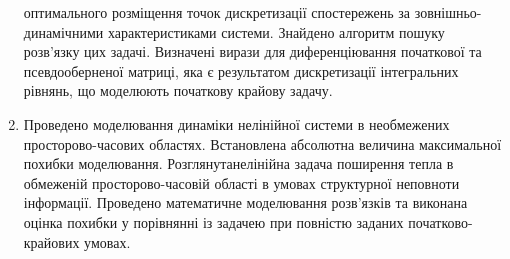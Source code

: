 \begin{enumerate}
  оптимального розміщення  точок дискретизації спостережень за зовнішньо-динамічними характеристиками системи.
  Знайдено алгоритм пошуку розв’язку цих задачі. Визначені вирази для диференціювання початкової та псевдооберненої
  матриці, яка є результатом дискретизації інтегральних рівнянь, що моделюють початкову крайову задачу.
  \item Проведено моделювання динаміки нелінійної системи в необмежених просторово-часових областях.
  Встановлена абсолютна величина максимальної похибки моделювання. Розглянутанелінійна задача поширення тепла в
  обмеженій просторово-часовій області в умовах структурної неповноти інформації. Проведено математичне моделювання
  розв’язків та виконана оцінка похибки у порівнянні із задачею при повністю заданих початково-крайових умовах.
\end{enumerate}